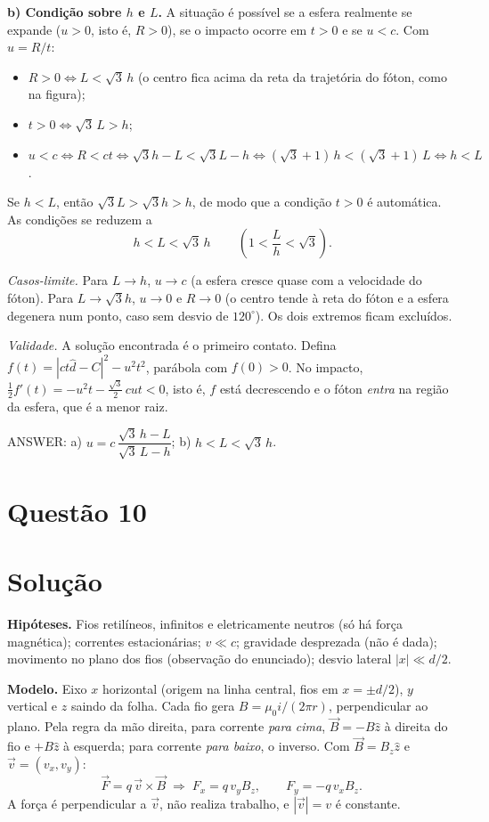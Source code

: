 \documentclass{article}%
\begin{document}
\textbf{b) Condição sobre $h$ e $L$.} A situação é possível se a esfera realmente se expande ($u>0$, isto é, $R>0$), se o impacto ocorre em $t>0$ e se $u<c$. Com $u=R/t$:
\begin{itemize}
\item $R>0 \iff L<\sqrt3\,h$ (o centro fica acima da reta da trajetória do fóton, como na figura);
\item $t>0 \iff \sqrt3\,L>h$;
\item $u<c \iff R<ct \iff \sqrt3h-L<\sqrt3L-h \iff (\sqrt3+1)\,h<(\sqrt3+1)\,L \iff h<L$.
\end{itemize}
Se $h<L$, então $\sqrt3L>\sqrt3h>h$, de modo que a condição $t>0$ é automática. As condições se reduzem a
\[
\boxed{\,h<L<\sqrt3\,h\,}\qquad\left(1<\frac{L}{h}<\sqrt3\right).
\]

\emph{Casos-limite.} Para $L\to h$, $u\to c$ (a esfera cresce quase com a velocidade do fóton). Para $L\to\sqrt3h$, $u\to0$ e $R\to0$ (o centro tende à reta do fóton e a esfera degenera num ponto, caso sem desvio de $120^\circ$). Os dois extremos ficam excluídos.

\emph{Validade.} A solução encontrada é o primeiro contato. Defina $f(t)=|ct\hat d-C|^2-u^2t^2$, parábola com $f(0)>0$. No impacto, $\tfrac12 f'(t)=-u^2t-\tfrac{\sqrt3}{2}\,cut<0$, isto é, $f$ está decrescendo e o fóton \emph{entra} na região da esfera, que é a menor raiz.

ANSWER: a) $u=c\,\dfrac{\sqrt3\,h-L}{\sqrt3\,L-h}$; b) $h<L<\sqrt3\,h$.%
\newpage%
\section*{Questão 10}

\section*{Solução}

\textbf{Hipóteses.} Fios retilíneos, infinitos e eletricamente neutros (só há força magnética); correntes estacionárias; $v\ll c$; gravidade desprezada (não é dada); movimento no plano dos fios (observação do enunciado); desvio lateral $|x|\ll d/2$.

\textbf{Modelo.} Eixo $x$ horizontal (origem na linha central, fios em $x=\pm d/2$), $y$ vertical e $z$ saindo da folha. Cada fio gera $B=\mu_0 i/(2\pi r)$, perpendicular ao plano. Pela regra da mão direita, para corrente \emph{para cima}, $\vec B=-B\hat z$ à direita do fio e $+B\hat z$ à esquerda; para corrente \emph{para baixo}, o inverso. Com $\vec B=B_z\hat z$ e $\vec v=(v_x,v_y)$:
\[
\vec F=q\,\vec v\times\vec B\;\Rightarrow\;F_x=q\,v_y B_z,\qquad F_y=-q\,v_x B_z .
\]
A força é perpendicular a $\vec v$, não realiza trabalho, e $|\vec v|=v$ é constante.
\end{document}
